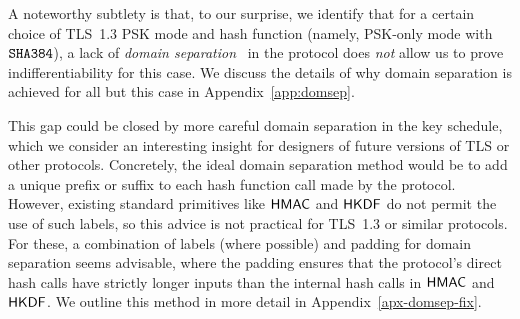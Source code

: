 	A noteworthy subtlety is that, to our surprise, we identify that for a certain choice of TLS~1.3 PSK mode and hash function (namely, PSK-only mode with $\texttt{SHA{384}}$),
	a lack of \emph{domain separation}~\cite{EC:BelDavGun20} in the protocol does \emph{not} allow us to prove indifferentiability for this case.
	We discuss the details of why domain separation is achieved for all but this case in 
	Appendix~\ref{app:domsep}.
	
	This gap could be closed by more careful domain separation in the key schedule, which we consider an interesting insight for designers of future versions of TLS or other protocols.
	Concretely, the ideal domain separation method would be to add a unique prefix or suffix to each hash function call made by the protocol.
	However, existing standard primitives like $\mathsf{HMAC}$ and $\mathsf{HKDF}$ do not permit the use of such labels, so this advice is not practical for TLS~1.3 or similar protocols.
	For these, a combination of labels (where possible) and padding for domain separation seems advisable,
	where the padding ensures that the protocol's direct hash calls have strictly longer inputs than the internal hash calls in $\mathsf{HMAC}$ and $\mathsf{HKDF}$.
	\iffull
	We outline this method in more detail in Appendix~\ref{apx-domsep-fix}.
	\fi
	
	
% 

